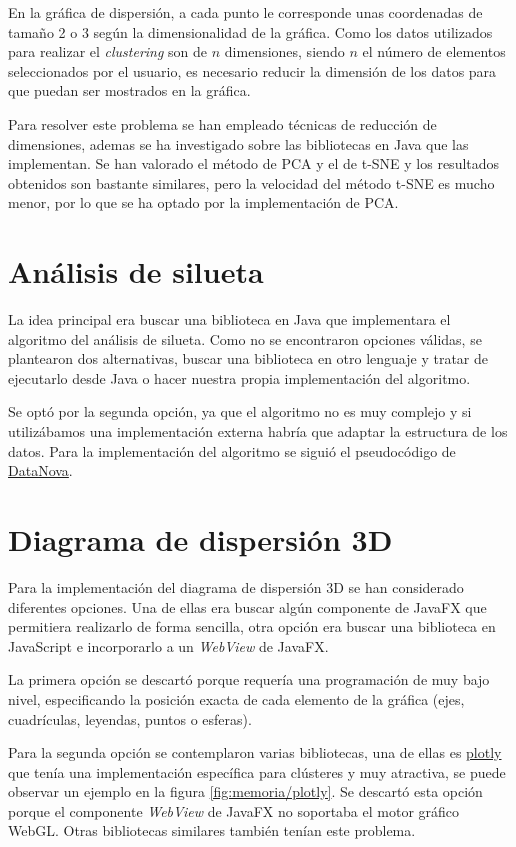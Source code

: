 En la gráfica de dispersión, a cada punto le corresponde unas coordenadas de tamaño 2 o 3 según la dimensionalidad de la gráfica. Como los datos utilizados para realizar el \emph{clustering} son de $n$ dimensiones, siendo $n$ el número de elementos seleccionados por el usuario, es necesario reducir la dimensión de los datos para que puedan ser mostrados en la gráfica.

Para resolver este problema se han empleado técnicas de reducción de dimensiones, ademas se ha investigado sobre las bibliotecas en Java que las implementan. Se han valorado el método de PCA y el de t-SNE y los resultados obtenidos son bastante similares, pero la velocidad del método t-SNE es mucho menor, por lo que se ha optado por la implementación de PCA.

\section{Análisis de silueta}
La idea principal era buscar una biblioteca en Java que implementara el algoritmo del análisis de silueta. Como no se encontraron opciones válidas, se plantearon dos alternativas, buscar una biblioteca en otro lenguaje y tratar de ejecutarlo desde Java o hacer nuestra propia implementación del algoritmo.

Se optó por la segunda opción, ya que el algoritmo no es muy complejo y si utilizábamos una implementación externa habría que adaptar la estructura de los datos. Para la implementación del algoritmo se siguió el pseudocódigo de \href{https://www.datanovia.com/en/lessons/cluster-validation-statistics-must-know-methods/#silhouette-coefficient}{DataNova}.

\section{Diagrama de dispersión 3D}
Para la implementación del diagrama de dispersión 3D se han considerado diferentes opciones. Una de ellas era buscar algún componente de JavaFX que permitiera realizarlo de forma sencilla, otra opción era buscar una biblioteca en JavaScript e incorporarlo a un \emph{WebView} de JavaFX.

La primera opción se descartó porque requería una programación de muy bajo nivel, especificando la posición exacta de cada elemento de la gráfica (ejes, cuadrículas, leyendas, puntos o esferas).

Para la segunda opción se contemplaron varias bibliotecas, una de ellas es \href{https://plotly.com/}{plotly} que tenía una implementación específica para clústeres y muy atractiva, se puede observar un ejemplo en la figura \ref{fig:memoria/plotly}. Se descartó esta opción porque el componente \emph{WebView} de JavaFX no soportaba el motor gráfico WebGL. Otras bibliotecas similares también tenían este problema.

